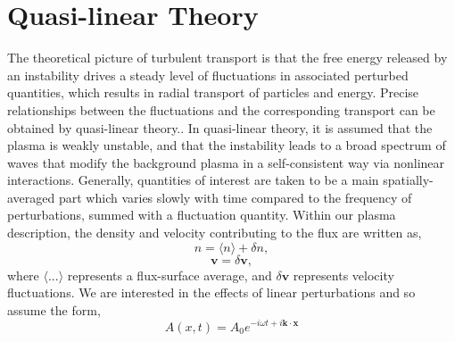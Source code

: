 \documentclass[12pt]{article}
\numberwithin{equation}{subsection}
\begin{document}
\section{Quasi-linear Theory}
   \quad The theoretical picture of turbulent transport is that the free energy released by an instability drives a steady level of
fluctuations in associated perturbed quantities, which results in radial transport of particles and energy. Precise relationships
between the fluctuations and the corresponding transport can be obtained by quasi-linear theory.\cite{WessonD}. In quasi-linear
theory, it is assumed that the plasma is weakly unstable, and that the instability leads to a broad spectrum of waves that modify
the background plasma in a self-consistent way via nonlinear interactions\cite{GurnBhatA}. Generally, quantities of interest are taken
to be a main spatially-averaged part which varies slowly with time compared to the frequency of perturbations, summed with a fluctuation
quantity. Within our plasma description, the density and velocity contributing to the flux are written as, 
   \begin{equation}
      n = \langle n \rangle + \delta n,
   \end{equation}
   \begin{equation}
      \bm{v} = \delta \bm{v},
   \end{equation}
where $\langle ... \rangle$ represents a flux-surface average, and $\delta \bm{v}$ represents velocity fluctuations. We are interested in
the effects of linear perturbations and so assume the form,   
   \begin{equation}
      A(x,t) = A_0e^{-i\omega t + i\bm{k}\cdot\bm{x}} 
   \end{equation}
\end{document}
